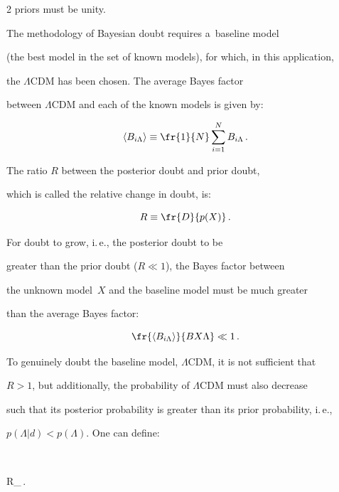 \begin{multicols}{2}
  priors must be unity.





  The methodology of Bayesian doubt requires a~baseline model


  (the best model in the set of known models), for which, in this application,


  the $\Lambda$CDM has been chosen. The average Bayes factor


  between $\Lambda$CDM and each of the known models is given by:


  $$


  \langle B_{i\Lambda}\rangle \equiv \fr{1}{N} \sum\limits_{i=1}^N


B_{i\Lambda}\,.


  $$





  The ratio $R$ between the posterior doubt and prior doubt,


  which is called the relative change in doubt, is:


  $$


  R\equiv \fr{D}{p(X)}\,.


  $$





  For doubt to grow, i.\,e., the posterior doubt to be


  greater than the prior doubt ($R\ll 1$), the Bayes factor between


  the unknown model~$X$ and the baseline model must be much greater


  than the average Bayes factor:


  $$


  \fr{\langle B_{i\Lambda}\rangle}{BX\Lambda} \ll 1\,.


  $$





  To genuinely doubt the baseline model, $\Lambda$CDM, it is not sufficient that


$R > 1$, but additionally, the probability of $\Lambda$CDM must also decrease


such that its posterior probability is greater than its prior probability, i.\,e.,


$p(\Lambda \vert d) < p(\Lambda)$. One can define:


  $$


  R_\Lambda \equiv {}\,.



\end{multicols}
